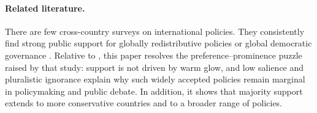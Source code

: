 \documentclass[12pt,english]{article}
\begin{document}

\paragraph{Related literature.} 
There are few cross-country surveys on international policies. They consistently find strong public support for globally redistributive policies \citep{cappelen_majority_2025,fabre_majority_2025} or global democratic governance \citep{ghassim_who_2024}. %
Relative to \cite{fabre_majority_2025}, this paper resolves the preference--prominence puzzle raised by that study: support is not driven by warm glow, and low salience and pluralistic ignorance explain why such widely accepted policies remain marginal in policymaking and public debate. In addition, it shows that majority support extends to more conservative countries and to a broader range of policies.
\end{document}
